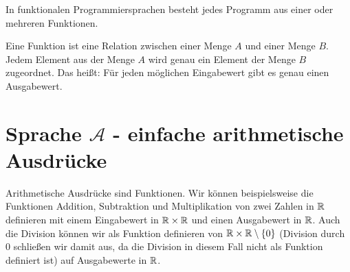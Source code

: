 In funktionalen Programmiersprachen besteht jedes Programm aus einer oder mehreren
Funktionen.
\begin{defn}[Funktion]\label{defn:Funktion}
Eine Funktion ist eine Relation zwischen einer Menge $A$ und einer Menge $B$.
Jedem Element aus der Menge $A$ wird genau ein Element der Menge $B$ zugeordnet.
Das heißt: Für jeden möglichen Eingabewert gibt es genau einen Ausgabewert.
\end{defn}

\section{Sprache $\mathcal{A}$ - einfache arithmetische Ausdrücke}
Arithmetische Ausdrücke sind Funktionen. Wir können beispielsweise die Funktionen
Addition, Subtraktion und Multiplikation von zwei Zahlen in $\mathbb{R}$ definieren mit einem
Eingabewert in $\mathbb{R} \times \mathbb{R}$ und einen Ausgabewert in $\mathbb{R}$. Auch die Division
können wir als Funktion definieren von $\mathbb{R} \times \mathbb{R} \setminus \left\{0\right\}$ (Division durch $0$ schließen
wir damit aus, da die Division in diesem Fall nicht als Funktion definiert ist) auf Ausgabewerte in $\mathbb{R}$.

